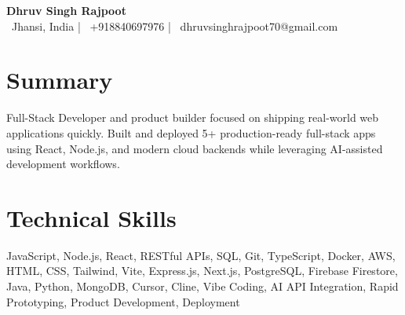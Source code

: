 \documentclass[10pt,a4paper]{article}
\begin{document}
\begin{center}
  {\LARGE\textbf{Dhruv Singh Rajpoot}} \\[3pt]
  \small
  \faMapMarker\ {Jhansi, India} \quad | \quad \faPhone\ {+918840697976} \quad | \quad \faEnvelope\ {dhruvsinghrajpoot70@gmail.com} \\[2pt]
  {} \quad {} \quad {}
\end{center}


\section{Summary}
Full-Stack Developer and product builder focused on shipping real-world web applications quickly. Built and deployed 5+ production-ready full-stack apps using React, Node.js, and modern cloud backends while leveraging AI-assisted development workflows.



\section{Technical Skills}
JavaScript, Node.js, React, RESTful APIs, SQL, Git, TypeScript, Docker, AWS, HTML, CSS, Tailwind, Vite, Express.js, Next.js, PostgreSQL, Firebase Firestore, Java, Python, MongoDB, Cursor, Cline, Vibe Coding, AI API Integration, Rapid Prototyping, Product Development, Deployment




\end{document}
